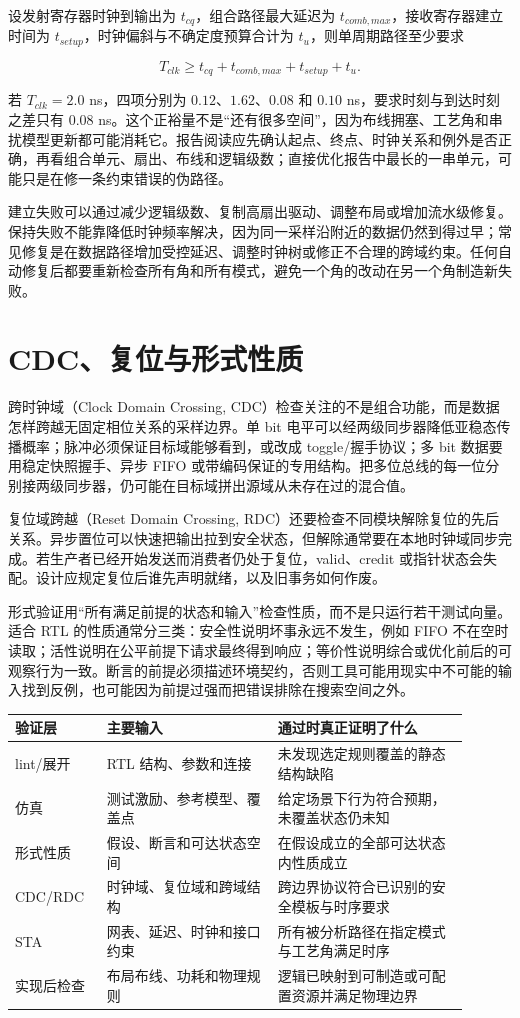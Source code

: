 设发射寄存器时钟到输出为 $t_{cq}$，组合路径最大延迟为 $t_{comb,max}$，接收寄存器建立时间为 $t_{setup}$，时钟偏斜与不确定度预算合计为 $t_u$，则单周期路径至少要求

\[
T_{clk} \ge t_{cq}+t_{comb,max}+t_{setup}+t_u.
\]

若 $T_{clk}=2.0$ ns，四项分别为 $0.12$、$1.62$、$0.08$ 和 $0.10$ ns，要求时刻与到达时刻之差只有 $0.08$ ns。这个正裕量不是“还有很多空间”，因为布线拥塞、工艺角和串扰模型更新都可能消耗它。报告阅读应先确认起点、终点、时钟关系和例外是否正确，再看组合单元、扇出、布线和逻辑级数；直接优化报告中最长的一串单元，可能只是在修一条约束错误的伪路径。

建立失败可以通过减少逻辑级数、复制高扇出驱动、调整布局或增加流水级修复。保持失败不能靠降低时钟频率解决，因为同一采样沿附近的数据仍然到得过早；常见修复是在数据路径增加受控延迟、调整时钟树或修正不合理的跨域约束。任何自动修复后都要重新检查所有角和所有模式，避免一个角的改动在另一个角制造新失败。

\section{CDC、复位与形式性质}

跨时钟域（Clock Domain Crossing, CDC）检查关注的不是组合功能，而是数据怎样跨越无固定相位关系的采样边界。单 bit 电平可以经两级同步器降低亚稳态传播概率；脉冲必须保证目标域能够看到，或改成 toggle/握手协议；多 bit 数据要用稳定快照握手、异步 FIFO 或带编码保证的专用结构。把多位总线的每一位分别接两级同步器，仍可能在目标域拼出源域从未存在过的混合值。

复位域跨越（Reset Domain Crossing, RDC）还要检查不同模块解除复位的先后关系。异步置位可以快速把输出拉到安全状态，但解除通常要在本地时钟域同步完成。若生产者已经开始发送而消费者仍处于复位，valid、credit 或指针状态会失配。设计应规定复位后谁先声明就绪，以及旧事务如何作废。

形式验证用“所有满足前提的状态和输入”检查性质，而不是只运行若干测试向量。适合 RTL 的性质通常分三类：安全性说明坏事永远不发生，例如 FIFO 不在空时读取；活性说明在公平前提下请求最终得到响应；等价性说明综合或优化前后的可观察行为一致。断言的前提必须描述环境契约，否则工具可能用现实中不可能的输入找到反例，也可能因为前提过强而把错误排除在搜索空间之外。

\begin{longtable}{L{0.18\linewidth}L{0.34\linewidth}L{0.38\linewidth}}
\toprule
验证层 & 主要输入 & 通过时真正证明了什么 \\
\midrule
lint/展开 & RTL 结构、参数和连接 & 未发现选定规则覆盖的静态结构缺陷 \\
仿真 & 测试激励、参考模型、覆盖点 & 给定场景下行为符合预期，未覆盖状态仍未知 \\
形式性质 & 假设、断言和可达状态空间 & 在假设成立的全部可达状态内性质成立 \\
CDC/RDC & 时钟域、复位域和跨域结构 & 跨边界协议符合已识别的安全模板与时序要求 \\
STA & 网表、延迟、时钟和接口约束 & 所有被分析路径在指定模式与工艺角满足时序 \\
实现后检查 & 布局布线、功耗和物理规则 & 逻辑已映射到可制造或可配置资源并满足物理边界 \\
\bottomrule
\end{longtable}

